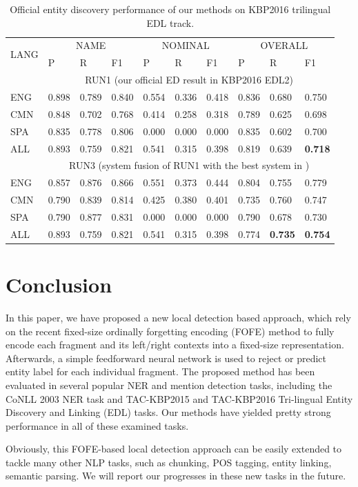 \documentclass[11pt,a4paper]{article}
\begin{document}
\begin{table}[h!]
	\centering
	\begin{tabular}{|l|lll|lll|lll|}
		\hline
		\multirow{2}{*}{LANG}  &
		\multicolumn{3}{c|}{NAME} & \multicolumn{3}{c|}{NOMINAL} & \multicolumn{3}{c|}{OVERALL} \\
		\ & P & R & F1 & P & R & F1 & P & R & F1 \\
		\hline \hline
		& \multicolumn{9}{c|}{RUN1 (our official ED result in KBP2016 EDL2)} \\ 
		\hline
		ENG & 0.898 & 0.789 & 0.840 & 0.554 & 0.336 & 0.418 & 0.836 & 0.680 & 0.750 \\
		CMN & 0.848 & 0.702 & 0.768 & 0.414 & 0.258 & 0.318 & 0.789 & 0.625 & 0.698 \\
		SPA & 0.835 & 0.778 & 0.806 & 0.000 & 0.000 & 0.000 & 0.835 & 0.602 & 0.700 \\
		ALL & 0.893 & 0.759 & 0.821 & 0.541 & 0.315 & 0.398 & 0.819 & 0.639 & {\bf 0.718} \\
		\hline
		& \multicolumn{9}{c|}{RUN3 (system fusion of RUN1 with the best system in \cite{kbp2016iflytek})} \\
		\hline
		ENG & 0.857	& 0.876 & 0.866 & 0.551 & 0.373 & 0.444 & 0.804 & 0.755 & 0.779 \\
		CMN & 0.790 & 0.839 & 0.814 & 0.425 & 0.380 & 0.401 & 0.735 & 0.760 & 0.747 \\
		SPA & 0.790 & 0.877 & 0.831 & 0.000 & 0.000 & 0.000 & 0.790 & 0.678 & 0.730 \\
		ALL & 0.893 & 0.759 & 0.821 & 0.541 & 0.315 & 0.398 & 0.774 & {\bf 0.735} & {\bf 0.754} \\
		\hline 
	\end{tabular}
	\caption{Official entity discovery performance of our methods on KBP2016 trilingual EDL track.}
	\label{tbl:kbp2016}
\end{table}

\section{Conclusion}

In this paper, we have proposed a new local detection based approach, which rely on the recent fixed-size ordinally forgetting encoding (FOFE) method to fully encode each fragment and its left/right contexts into a fixed-size representation. Afterwards, a simple feedforward neural network is used to reject or predict entity label for each individual fragment. The proposed method has been evaluated in several popular NER and mention detection tasks, including the CoNLL 2003 NER task and  TAC-KBP2015 and TAC-KBP2016 Tri-lingual Entity Discovery and Linking (EDL) tasks. Our methods have yielded pretty strong performance in all of these examined tasks. 

Obviously, this FOFE-based local detection approach can be easily extended to tackle many other NLP tasks, such as chunking, POS tagging, entity linking, semantic parsing. We will report our progresses in these new tasks in the future.  



	
	
\end{document}
